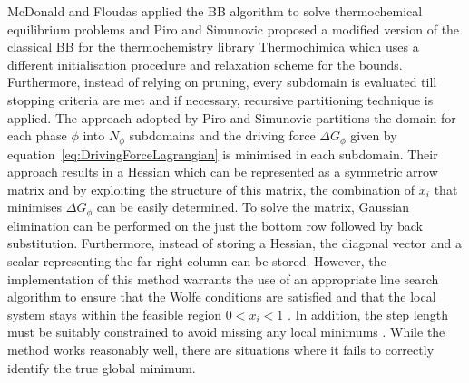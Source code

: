McDonald and Floudas \cite{McDonald95} applied the BB algorithm to solve thermochemical equilibrium problems and Piro and Simunovic \cite{Piro16} proposed a modified version of the classical BB for the thermochemistry library {Thermochimica} which uses a different initialisation procedure and relaxation scheme for the bounds. Furthermore, instead of relying on pruning, every subdomain is evaluated till stopping criteria are met and if necessary, recursive partitioning technique is applied. The approach adopted by Piro and Simunovic \cite{Piro16} partitions the domain for each phase $\phi$ into $N_\phi$ subdomains and the driving force $\Delta G_\phi$ given by equation~\eqref{eq:DrivingForceLagrangian} is minimised in each subdomain. Their approach results in a Hessian which can be represented as a symmetric arrow matrix and by exploiting the structure of this matrix, the combination of $x_i$ that minimises $\Delta G_\phi$ can be easily determined. To solve the matrix, Gaussian elimination can be performed on the just the bottom row followed by back substitution. Furthermore, instead of storing a Hessian, the diagonal vector and a scalar representing the far right column can be stored. However, the implementation of this method warrants the use of an appropriate line search algorithm to ensure that the Wolfe conditions are satisfied and that the local system stays within the feasible region $0 < x_i <1$ . In addition, the step length must be suitably constrained to avoid missing any local minimums \cite{Piro16}. While the method works reasonably well, there are situations where it fails to correctly identify the true global minimum.

